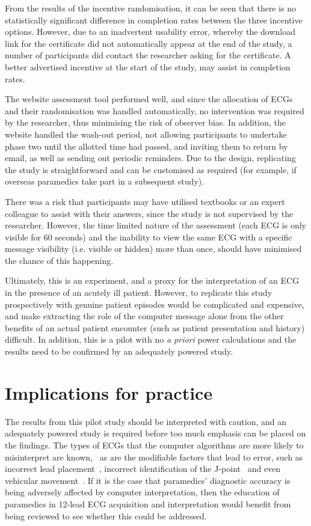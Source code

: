 From the results of the incentive randomisation, it can be seen that there is no statistically significant difference in completion rates between the three incentive options. However, due to an inadvertent usability error, whereby the download link for the certificate did not automatically appear at the end of the study, a number of participants did contact the researcher asking for the certificate. A better advertised incentive at the start of the study, may assist in completion rates.

The website assessment tool performed well, and since the allocation of ECGs and their randomisation was handled automatically, no intervention was required by the researcher, thus minimising the risk of observer bias. In addition, the website handled the wash-out period, not allowing participants to undertake phase two until the allotted time had passed, and inviting them to return by email, as well as sending out periodic reminders. Due to the design, replicating the study is straightforward and can be customised as required (for example, if overseas paramedics take part in a subsequent study).

There was a risk that participants may have utilised textbooks or an expert colleague to assist with their answers, since the study is not supervised by the researcher. However, the time limited nature of the assessment (each ECG is only visible for 60 seconds) and the inability to view the same ECG with a specific message visibility (i.e. visible or hidden) more than once, should have minimised the chance of this happening.

Ultimately, this is an experiment, and a proxy for the interpretation of an ECG in the presence of an acutely ill patient. However, to replicate this study prospectively with genuine patient episodes would be complicated and expensive, and make extracting the role of the computer message alone from the other benefits of an actual patient encounter (such as patient presentation and history) difficult. In addition, this is a pilot with no \emph{a priori} power calculations and the results need to be confirmed by an adequately powered study.

\section{Implications for practice}
\label{implicationsforpractice}

The results from this pilot study should be interpreted with caution, and an adequately powered study is required before too much emphasis can be placed on the findings. The types of ECGs that the computer algorithms are more likely to misinterpret are known,~\citep{ting_implementation_2008} as are the modifiable factors that lead to error, such as incorrect lead placement~\citep{mccann_accuracy_2007,rajaganeshan_accuracy_2008}, incorrect identification of the J-point~\citep{williams_paramedic_2008} and even vehicular movement~\citep{hebel_accuracy_1994}. If it is the case that paramedics' diagnostic accuracy is being adversely affected by computer interpretation, then the education of paramedics in 12-lead ECG acquisition and interpretation would benefit from being reviewed to see whether this could be addressed.

